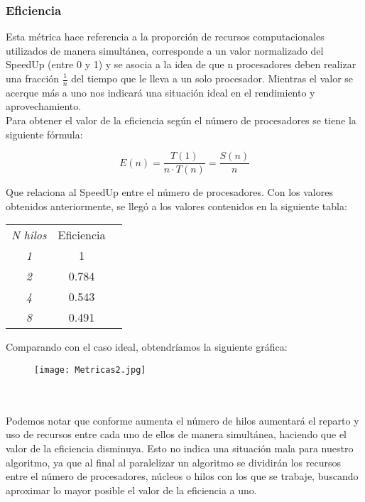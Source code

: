 \documentclass{article}
\begin{document}
\subsubsection{Eficiencia}

Esta métrica hace referencia a la proporción de recursos computacionales utilizados de manera simultánea, corresponde a un valor normalizado del SpeedUp (entre 0 y 1) y se asocia a la idea de que n procesadores deben realizar una fracción $\frac{1}{n}$ del tiempo que le lleva a un solo procesador. Mientras el valor se acerque más a uno nos indicará una situación ideal en el rendimiento y aprovechamiento.\\

Para obtener el valor de la eficiencia según el número de procesadores se tiene la siguiente fórmula:

$$
E(n)=\frac{T(1)}{n \cdot T(n)}=\frac{S(n)}{n}
$$

Que relaciona al SpeedUp entre el número de procesadores. Con los valores obtenidos anteriormente, se llegó a los valores contenidos en la siguiente tabla:\\

\begin{center}
\begin{tabular}{ c c c }
\textit{N hilos} & Eficiencia\\
 \textit{1} & 1\\ 
 \textit{2} & 0.784\\ 
\textit{4} & 0.543\\
\textit{8} & 0.491
\end{tabular}
\end{center}

Comparando con el caso ideal, obtendríamos la siguiente gráfica:\\
\begin{figure}[h]
\centering
\texttt{[image: Metricas2.jpg]}
\end{figure}
\\ \\Podemos notar que conforme aumenta el número de hilos aumentará el reparto y uso de recursos entre cada uno de ellos de manera simultánea, haciendo que el valor de la eficiencia disminuya. Esto no indica una situación mala para nuestro algoritmo, ya que al final al paralelizar un algoritmo se dividirán los recursos entre el número de procesadores, núcleos o hilos con los que se trabaje, buscando aproximar lo mayor posible el valor de la eficiencia a uno. \\ \\
\end{document}
